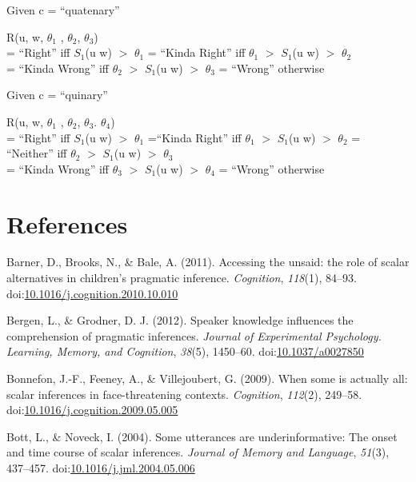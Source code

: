 \documentclass[floatsintext,man]{apa6}
\theoremstyle{definition}
\theoremstyle{definition}
\theoremstyle{definition}
\theoremstyle{remark}
\begin{document}
Given c = \enquote{quatenary}

R(u, w, \(\theta_1\) , \(\theta_2\), \(\theta_3\))\\
= \enquote{Right} iff \(S_1\)(u \textbar{} w) \(>\) \(\theta_1\) =
\enquote{Kinda Right} iff \(\theta_1\) \(>\) \(S_1\)(u \textbar{} w)
\(>\) \(\theta_2\)\\
= \enquote{Kinda Wrong} iff \(\theta_2\) \(>\) \(S_1\)(u \textbar{} w)
\(>\) \(\theta_3\) = \enquote{Wrong} otherwise

Given c = \enquote{quinary}

R(u, w, \(\theta_1\) , \(\theta_2\), \(\theta_3\). \(\theta_4\))\\
= \enquote{Right} iff \(S_1\)(u \textbar{} w) \(>\) \(\theta_1\)
=\enquote{Kinda Right} iff \(\theta_1\) \(>\) \(S_1\)(u \textbar{} w)
\(>\) \(\theta_2\) = \enquote{Neither} iff \(\theta_2\) \(>\) \(S_1\)(u
\textbar{} w) \(>\) \(\theta_3\)\\
= \enquote{Kinda Wrong} iff \(\theta_3\) \(>\) \(S_1\)(u \textbar{} w)
\(>\) \(\theta_4\) = \enquote{Wrong} otherwise

\newpage

\section{References}\label{references}

\setlength{\parindent}{-0.5in} \setlength{\leftskip}{0.5in}

\hypertarget{refs}{}
\hypertarget{ref-Barner2011}{}
Barner, D., Brooks, N., \& Bale, A. (2011). Accessing the unsaid: the
role of scalar alternatives in children's pragmatic inference.
\emph{Cognition}, \emph{118}(1), 84--93.
doi:\href{https://doi.org/10.1016/j.cognition.2010.10.010}{10.1016/j.cognition.2010.10.010}

\hypertarget{ref-Bergen2012}{}
Bergen, L., \& Grodner, D. J. (2012). Speaker knowledge influences the
comprehension of pragmatic inferences. \emph{Journal of Experimental
Psychology. Learning, Memory, and Cognition}, \emph{38}(5), 1450--60.
doi:\href{https://doi.org/10.1037/a0027850}{10.1037/a0027850}

\hypertarget{ref-Bonnefon2009}{}
Bonnefon, J.-F., Feeney, A., \& Villejoubert, G. (2009). When some is
actually all: scalar inferences in face-threatening contexts.
\emph{Cognition}, \emph{112}(2), 249--58.
doi:\href{https://doi.org/10.1016/j.cognition.2009.05.005}{10.1016/j.cognition.2009.05.005}

\hypertarget{ref-Bott2004}{}
Bott, L., \& Noveck, I. (2004). Some utterances are underinformative:
The onset and time course of scalar inferences. \emph{Journal of Memory
and Language}, \emph{51}(3), 437--457.
doi:\href{https://doi.org/10.1016/j.jml.2004.05.006}{10.1016/j.jml.2004.05.006}
\end{document}
